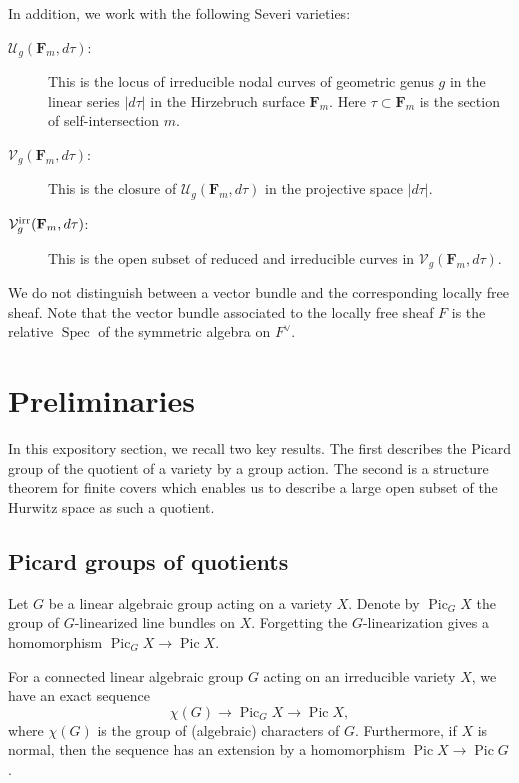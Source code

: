\documentclass{article}
\providecommand{\spec}{\operatorname{Spec}}
\providecommand{\Pic}{\operatorname{Pic}}
\newcommand{\V}{\mathcal V}
\newcommand{\U}{\mathcal U}
\newcommand{\F}{{\mathbf F}}
\newcommand{\irr}{{\rm irr}}
\numberwithin{equation}{section}
\begin{document}
In addition, we work with the following Severi varieties:
\begin{description}
\item[$\U_{g}(\F_m, d\tau)$:] This is the locus of irreducible nodal curves of geometric genus $g$ in the linear series $|d\tau|$ in the Hirzebruch surface $\F_m$. Here $\tau \subset \F_m$ is the section of self-intersection $m$.
\item[$\V_{g}(\F_m, d\tau)$:] This is the closure of $\U_{g}(\F_m, d\tau)$ in the projective space $|d\tau|$.
\item[$\V^\irr_{g}(\F_m, d\tau)$:] This is the open subset of reduced and irreducible curves in $\V_{g}(\F_m, d\tau)$.
\end{description}

We do not distinguish between a vector bundle and the corresponding locally free sheaf. Note that the vector bundle associated to the locally free sheaf $F$ is the relative $\spec$ of the symmetric algebra on $F^\vee$.


\section{Preliminaries}\label{sec:preliminaries}
In this expository section, we recall two key results. The first describes the Picard group of the quotient of a variety by a group action. The second is a structure theorem for finite covers which enables us to describe a large open subset of the Hurwitz space as such a quotient.

\subsection{Picard groups of quotients}
Let $G$ be a linear algebraic group acting on a variety $X$. Denote by $\Pic_GX$ the group of $G$-linearized line bundles on $X$. Forgetting the $G$-linearization gives a homomorphism $\Pic_GX \to \Pic X$.
\begin{proposition}\label{thm:kkv}\cite[Lemma~2.2 + Proposition~2.3]{hanspeter89:_picar_group_of_g_variet} For a connected linear algebraic group $G$ acting on an irreducible variety $X$, we have an exact sequence
   \[ \chi(G) \to \Pic_G X \to \Pic X,\]
   where $\chi(G)$ is the group of (algebraic) characters of $G$. Furthermore, if $X$ is normal, then the sequence has an extension by a homomorphism $\Pic X \to \Pic G$.
 \end{proposition}
 
\end{document}
